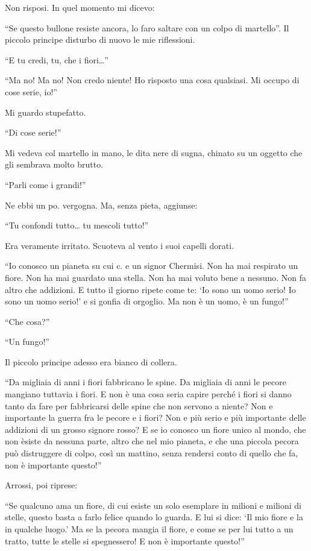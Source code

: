 \documentclass[11pt]{scrbook}
\begin{document}
Non risposi. In quel momento mi dicevo:

``Se questo bullone resiste ancora, lo faro saltare con un colpo di
martello''. Il piccolo principe disturbo di nuovo le mie riflessioni.

``E tu credi, tu, che i fiori\ldots{}''

``Ma no! Ma no! Non credo niente! Ho risposto una cosa qualsiasi. Mi
occupo di cose serie, io!''

Mi guardo stupefatto.

``Di cose serie!''

Mi vedeva col martello in mano, le dita nere di sugna, chinato su un
oggetto che gli sembrava molto brutto.

``Parli come i grandi!''

Ne ebbi un po. vergogna. Ma, senza pieta, aggiunse:

``Tu confondi tutto\ldots{} tu mescoli tutto!''

Era veramente irritato. Scuoteva al vento i suoi capelli dorati.

``Io conosco un pianeta su cui c. e un signor Chermisi. Non ha mai
respirato un fiore. Non ha mai guardato una stella. Non ha mai voluto
bene a nessuno. Non fa altro che addizioni. E tutto il giorno ripete
come te: `Io sono un uomo serio! Io sono un uomo serio!' e si gonfia di
orgoglio. Ma non è un uomo, è un fungo!''

``Che cosa?''

``Un fungo!''

Il piccolo principe adesso era bianco di collera.

``Da migliaia di anni i fiori fabbricano le spine. Da migliaia di anni
le pecore mangiano tuttavia i fiori. E non è una cosa seria capire
perché i fiori si danno tanto da fare per fabbricarsi delle spine che
non servono a niente? Non e importante la guerra fra le pecore e i
fiori? Non e più serio e più importante delle addizioni di un grosso
signore rosso? E se io conosco un fiore unico al mondo, che non èsiste
da nessuna parte, altro che nel mio pianeta, e che una piccola pecora
può distruggere di colpo, così un mattino, senza rendersi conto di
quello che fa, non è importante questo!''

Arrossi, poi riprese:

``Se qualcuno ama un fiore, di cui esiste un solo esemplare in milioni e
milioni di stelle, questo basta a farlo felice quando lo guarda. E lui
si dice: `Il mio fiore e la in qualche luogo.' Ma se la pecora mangia il
fiore, e come se per lui tutto a un tratto, tutte le stelle si
spegnessero! E non è importante questo!''
\end{document}
